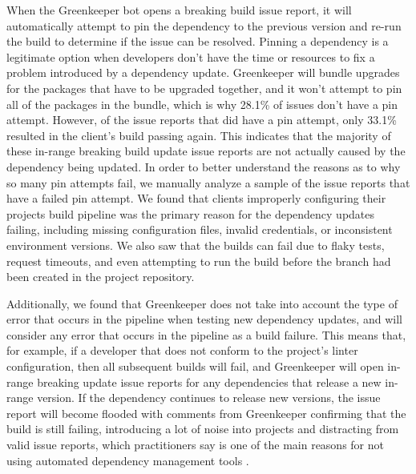 
\par
When the Greenkeeper bot opens a breaking build issue report, it will automatically attempt to pin the dependency to the previous version and re-run the build to determine if the issue can be resolved. Pinning a dependency is a legitimate option when developers don’t have the time or resources to fix a problem introduced by a dependency update. Greenkeeper will bundle upgrades for the packages that have to be upgraded together, and it won’t attempt to pin all of the packages in the bundle, which is why 28.1\% of issues don’t have a pin attempt. However, of the issue reports that did have a pin attempt, only 33.1\% resulted in the client's build passing again. This indicates that the majority of these in-range breaking build update issue reports are not actually caused by the dependency being updated. In order to better understand the reasons as to why so many pin attempts fail, we manually analyze a sample of the issue reports that have a failed pin attempt. We found that clients improperly configuring their projects build pipeline was the primary reason for the dependency updates failing, including missing configuration files, invalid credentials, or inconsistent environment versions. We also saw that the builds can fail due to flaky tests, request timeouts, and even  attempting to run the build before the branch had been created in the project repository.
\par
Additionally, we found that Greenkeeper does not take into account the type of error that occurs in the pipeline when testing new dependency updates, and will consider any error that occurs in the pipeline as a build failure. This means that, for example, if a developer that does not conform to the project's linter configuration, then all subsequent builds will fail, and Greenkeeper will open in-range breaking update issue reports for any dependencies that release a new in-range version. If the dependency continues to release new versions, the issue report will become flooded with comments from Greenkeeper confirming that the build is still failing, introducing a lot of noise into projects and distracting from valid issue reports, which practitioners say is one of the main reasons for not using automated dependency management tools \cite{ACM2017_Mirhosseini_AutomatedPullRequests}.
\newline
\par
{}